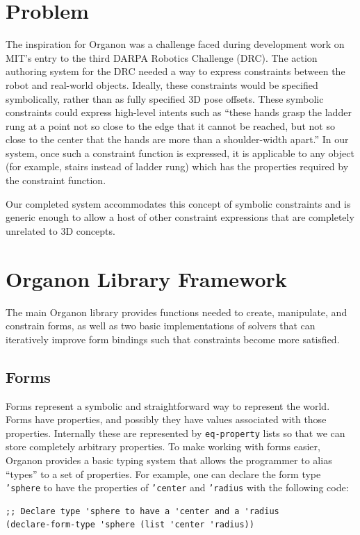 \documentclass[12pt,a4paper]{article}
\begin{document}
\section{Problem}
The inspiration for Organon was a challenge faced during development work on MIT's entry to the third DARPA Robotics Challenge (DRC). The action authoring system for the DRC needed a way to express constraints between the robot and real-world objects. Ideally, these constraints would be specified symbolically, rather than as fully specified 3D pose offsets. These symbolic constraints could express high-level intents such as ``these hands grasp the ladder rung at a point not so close to the edge that it cannot be reached, but not so close to the center that the hands are more than a shoulder-width apart.'' In our system, once such a constraint function is expressed, it is applicable to any object (for example, stairs instead of  ladder rung) which has the properties required by the constraint function.

Our completed system accommodates this concept of symbolic constraints and is generic enough to allow a host of other constraint expressions that are completely unrelated to 3D concepts.

\section{Organon Library Framework}
The main Organon library provides functions needed to create, manipulate, and constrain forms, as well as two basic implementations of solvers that can iteratively improve form bindings such that constraints become more satisfied.  

\subsection{Forms}
Forms represent a symbolic and straightforward way to represent the world.  Forms have properties, and possibly they have values associated with those properties.  Internally these are represented by \texttt{eq-property} lists so that we can store completely arbitrary properties.  To make working with forms easier, Organon provides a basic typing system that allows the programmer to alias ``types'' to a set of properties. For example, one can declare the form type \texttt{'sphere} to have the properties of \texttt{'center} and \texttt{'radius} with the following code:

\begin{lstlisting}
;; Declare type 'sphere to have a 'center and a 'radius
(declare-form-type 'sphere (list 'center 'radius)) 
\end{lstlisting}
\end{document}

